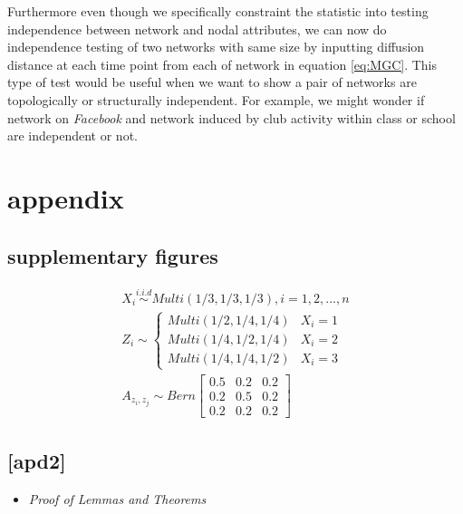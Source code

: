 \documentclass[12pt]{article}
\theoremstyle{definition}
\begin{document}
Furthermore even though we specifically constraint the statistic into testing independence between network and nodal attributes, we can now do independence testing of two networks with same size by inputting diffusion distance at each time point from each of network in equation \ref{eq:MGC}. This type of test would be useful when we want to show a pair of networks are topologically or structurally independent. For example, we might wonder if network on \textit{Facebook} and network induced by club activity within class or school are independent or not. 
	
\appendix
\section{appendix}
	
\subsection{supplementary figures}

\begin{equation}
\begin{gathered}
	X_{i} \overset{i.i.d}{\sim} Multi(1/3, 1/3, 1/3), i = 1,2, ... , n \\ 
	Z_{i}  \sim  \left\{  \begin{array}{ccc} Multi(1/2, 1/4, 1/4) & X_{i} = 1 \\ Multi(1/4, 1/2, 1/4) & X_{i} = 2 \\ Multi(1/4, 1/4, 1/2) & X_{i} = 3  \end{array} \right. \\
	A_{z_{i}, z_{j}} \sim Bern \left[  \begin{array}{ccc}   0.5 & 0.2 &  0.2  \\ 0.2 & 0.5 & 0. 2  \\ 0.2 & 0.2 & 0.2  \end{array}  \right]
\end{gathered}
\end{equation}
	
	
	
\subsection{[apd2]}
	\begin{itemize}
		\item {\it  Proof of Lemmas and Theorems  \/}
	\end{itemize}
	
\end{document}

